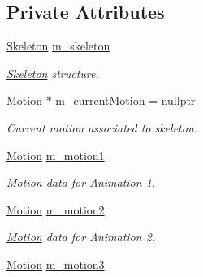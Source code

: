 \subsection*{Private Attributes}
\begin{DoxyCompactItemize}
\item 
\hyperlink{class_skeleton}{Skeleton} \hyperlink{class_character_a5f393a396da1aecf291a641b76f80222}{m\+\_\+skeleton}\hypertarget{class_character_a5f393a396da1aecf291a641b76f80222}{}\label{class_character_a5f393a396da1aecf291a641b76f80222}

\begin{DoxyCompactList}\small\item\em \hyperlink{class_skeleton}{Skeleton} structure. \end{DoxyCompactList}\item 
\hyperlink{class_motion}{Motion} $\ast$ \hyperlink{class_character_ae62826de94da6c220da5daf60b5bb7db}{m\+\_\+current\+Motion} = nullptr\hypertarget{class_character_ae62826de94da6c220da5daf60b5bb7db}{}\label{class_character_ae62826de94da6c220da5daf60b5bb7db}

\begin{DoxyCompactList}\small\item\em Current motion associated to skeleton. \end{DoxyCompactList}\item 
\hyperlink{class_motion}{Motion} \hyperlink{class_character_a35a57256ebba2a5aacd270711879027e}{m\+\_\+motion1}\hypertarget{class_character_a35a57256ebba2a5aacd270711879027e}{}\label{class_character_a35a57256ebba2a5aacd270711879027e}

\begin{DoxyCompactList}\small\item\em \hyperlink{class_motion}{Motion} data for Animation 1. \end{DoxyCompactList}\item 
\hyperlink{class_motion}{Motion} \hyperlink{class_character_a9f9c7ede39a8974a3d0107ecbaffd916}{m\+\_\+motion2}\hypertarget{class_character_a9f9c7ede39a8974a3d0107ecbaffd916}{}\label{class_character_a9f9c7ede39a8974a3d0107ecbaffd916}

\begin{DoxyCompactList}\small\item\em \hyperlink{class_motion}{Motion} data for Animation 2. \end{DoxyCompactList}\item 
\hyperlink{class_motion}{Motion} \hyperlink{class_character_a151f601061296aed2990702934ded822}{m\+\_\+motion3}\hypertarget{class_character_a151f601061296aed2990702934ded822}{}\label{class_character_a151f601061296aed2990702934ded822}


\end{DoxyCompactItemize}
